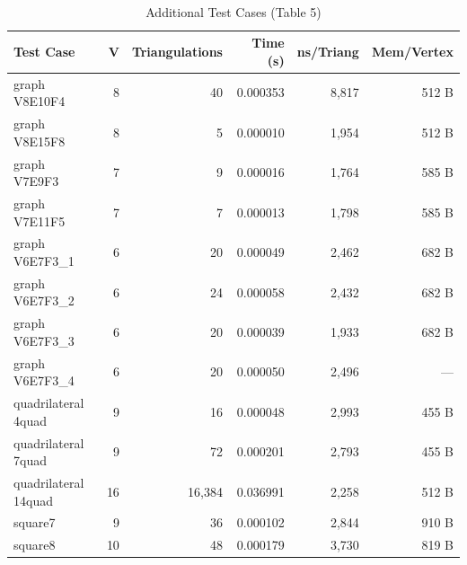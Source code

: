 ﻿﻿\documentclass[12pt,a4paper]{article}
\theoremstyle{definition}
\theoremstyle{remark}
\begin{document}
\begin{table}[htbp]
	\centering
	\footnotesize
	\caption{Additional Test Cases (Table 5)}
	\label{tab:timing_results_part2}
	\begin{tabular}{|l|r|r|r|r|r|}
		\hline
		\textbf{Test Case}   & \textbf{V} & \textbf{Triangulations} & \textbf{Time (s)} & \textbf{ns/Triang} & \textbf{Mem/Vertex} \\
		\hline
		graph V8E10F4        & 8          & 40                      & 0.000353          & 8,817              & 512 B               \\
		graph V8E15F8        & 8          & 5                       & 0.000010          & 1,954              & 512 B               \\
		graph V7E9F3         & 7          & 9                       & 0.000016          & 1,764              & 585 B               \\
		graph V7E11F5        & 7          & 7                       & 0.000013          & 1,798              & 585 B               \\
		graph V6E7F3\_1      & 6          & 20                      & 0.000049          & 2,462              & 682 B               \\
		graph V6E7F3\_2      & 6          & 24                      & 0.000058          & 2,432              & 682 B               \\
		graph V6E7F3\_3      & 6          & 20                      & 0.000039          & 1,933              & 682 B               \\
		graph V6E7F3\_4      & 6          & 20                      & 0.000050          & 2,496              & ---                 \\
		\hline
		quadrilateral 4quad  & 9          & 16                      & 0.000048          & 2,993              & 455 B               \\
		quadrilateral 7quad  & 9          & 72                      & 0.000201          & 2,793              & 455 B               \\
		quadrilateral 14quad & 16         & 16,384                  & 0.036991          & 2,258              & 512 B               \\
		\hline
		square7              & 9          & 36                      & 0.000102          & 2,844              & 910 B               \\
		square8              & 10         & 48                      & 0.000179          & 3,730              & 819 B               \\

\end{tabular}
\end{table}
\end{document}
